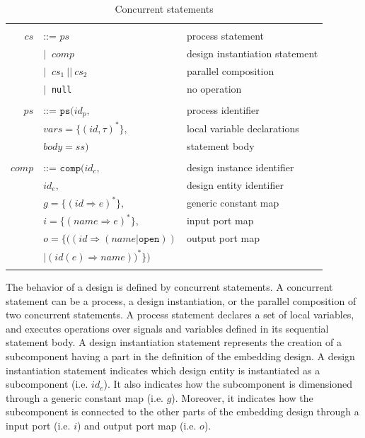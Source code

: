 \documentclass[pdflatex,sn-mathphys]{sn-jnl}%
\theoremstyle{thmstyleone}%
\theoremstyle{thmstyletwo}%
\theoremstyle{thmstylethree}%
\begin{document}
\begin{table}[!htbp]
  \caption{Concurrent statements}
  \label{tab:cs}
  \begin{tabular}{|rll|}
    \hline
    & & \\
    $cs$ & ::= $ps$ & process statement \\
    & $\vert{}~$ $comp$ & design instantiation statement \\
    & $\vert{}~$ $cs_1~\mathtt{||}~cs_2$ & parallel composition \\
    & $\vert{}~$ \texttt{null} & no operation \\
    & & \\
    $ps$ & ::= $\mathtt{ps}(id_p,$ & process identifier \\
    & \quad\quad\quad${}vars=\{(id,\tau)^{*}\},$ & local variable declarations\\
    & \quad\quad\quad${}body=ss)$ & statement body \\
    & & \\
    $comp$ & ::= $\mathtt{comp}(id_c,$ & design instance identifier \\
      & \quad\quad\quad\quad$id_e,$ & design entity identifier \\
      & \quad\quad\quad\quad${}g=\{(id\Rightarrow{}e)^{*}\},$ & generic constant map \\
      & \quad\quad\quad\quad${}i=\{(name\Rightarrow{}e)^{*}\},$ & input port map \\
    & \quad\quad\quad\quad$o=\{\big((id\Rightarrow{}(name\vert{}\mathtt{open}))$ & output port map \\
    & \quad\quad\quad\quad\quad\quad\quad$\big\vert{}(id(e)\Rightarrow{}name)\big)^{*}\})$ &  \\
    & & \\
    \hline
  \end{tabular}

\end{table}

The behavior of a design is defined by concurrent statements. A
concurrent statement can be a process, a design instantiation, or the
parallel composition of two concurrent statements. A process statement
declares a set of local variables, and executes operations over
signals and variables defined in its sequential statement body. A
design instantiation statement represents the creation of a
subcomponent having a part in the definition of the embedding
design. A design instantiation statement indicates which design entity
is instantiated as a subcomponent (i.e. $id_e$). It also indicates how
the subcomponent is dimensioned through a generic constant map
(i.e. $g$). Moreover, it indicates how the subcomponent is connected
to the other parts of the embedding design through a input port
(i.e. $i$) and output port map (i.e. $o$).
\end{document}

